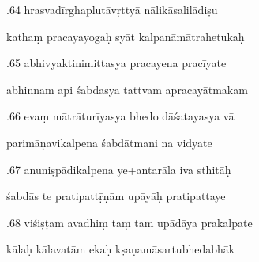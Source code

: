 \documentclass[article,12pt,a4paper]{memoir}%
\newcounter{parCount}
\begin{document}
	  
	  \pstart {}.64 hrasvadīrghaplutāvṛttyā nālikāsalilādiṣu 
	{}
	\pend%
      

	  
	  \pstart \leavevmode%
	kathaṃ pracayayogaḥ syāt kalpanāmātrahetukaḥ 
	{}
	\pend%
      

	  
	  \pstart {}.65 abhivyaktinimittasya pracayena pracīyate 
	{}
	\pend%
      

	  
	  \pstart \leavevmode%
	abhinnam api śabdasya tattvam apracayātmakam 
	{}
	\pend%
      

	  
	  \pstart {}.66 evaṃ mātrāturīyasya bhedo dāśatayasya vā 
	{}
	\pend%
      

	  
	  \pstart \leavevmode%
	parimāṇavikalpena śabdātmani na vidyate 
	{}
	\pend%
      

	  
	  \pstart {}.67 anuniṣpādikalpena ye+antarāla iva sthitāḥ 
	{}
	\pend%
      

	  
	  \pstart \leavevmode%
	śabdās te pratipattṝṇām upāyāḥ pratipattaye 
	{}
	\pend%
      

	  
	  \pstart {}.68 viśiṣṭam avadhiṃ taṃ tam upādāya prakalpate 
	{}
	\pend%
      

	  
	  \pstart \leavevmode%
	kālaḥ kālavatām ekaḥ kṣaṇamāsartubhedabhāk 
	{}
	\pend%
      
\end{document}

